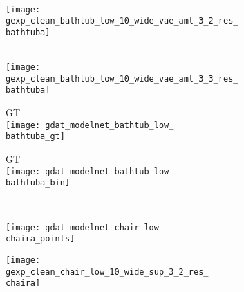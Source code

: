 \begin{figure*}[t]
{\begin{subfigure}[t]{1\textwidth}
\begin{subfigure}[t]{0.095\textwidth}
   			\vspace{0px}\centering
   			\AML\\
   			\texttt{[image: gexp\_clean\_bathtub\_low\_10\_wide\_vae\_aml\_3\_2\_res\_\\bathtuba]}
   		\end{subfigure}
   		\begin{subfigure}[t]{0.095\textwidth}
   			\vspace{0px}\centering
   			\AML\\
   			\texttt{[image: gexp\_clean\_bathtub\_low\_10\_wide\_vae\_aml\_3\_3\_res\_\\bathtuba]}
   		\end{subfigure}
   		\begin{subfigure}[t]{0.095\textwidth}
   			\vspace{0px}\centering
   			GT\\
   			\texttt{[image: gdat\_modelnet\_bathtub\_low\_\\bathtuba\_gt]}
   		\end{subfigure}
   		\begin{subfigure}[t]{0.095\textwidth}
   			\vspace{0px}\centering
   			GT\\
   			\texttt{[image: gdat\_modelnet\_bathtub\_low\_\\bathtuba\_bin]}
   		\end{subfigure}
   		\\[2px]
   		\begin{subfigure}[t]{0.095\textwidth}
   			\vspace{0px}\centering
   			\texttt{[image: gdat\_modelnet\_chair\_low\_\\chaira\_points]}
   		\end{subfigure}
   		\begin{subfigure}[t]{0.095\textwidth}
   			\vspace{0px}\centering
   			\texttt{[image: gexp\_clean\_chair\_low\_10\_wide\_sup\_3\_2\_res\_\\chaira]}
   		\end{subfigure}
   		\begin{subfigure}[t]{0.095\textwidth}
   			\vspace{0px}\centering

\end{subfigure}
\end{subfigure}}
\end{figure*}
